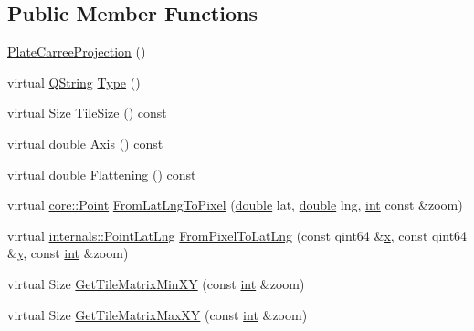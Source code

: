 \subsection*{Public Member Functions}
\begin{DoxyCompactItemize}
\item 
\hyperlink{group___o_p_map_widget_ga931c372d511eb5f902be68e721dea1a1}{Plate\-Carree\-Projection} ()
\item 
virtual \hyperlink{group___u_a_v_objects_plugin_gab9d252f49c333c94a72f97ce3105a32d}{Q\-String} \hyperlink{group___o_p_map_widget_ga71ab3c89676e92a088c8ac2ce4058142}{Type} ()
\item 
virtual Size \hyperlink{group___o_p_map_widget_gacf9afa88981c6504040c08c19731ea98}{Tile\-Size} () const 
\item 
virtual \hyperlink{_super_l_u_support_8h_a8956b2b9f49bf918deed98379d159ca7}{double} \hyperlink{group___o_p_map_widget_ga0917ee78fdc28e179792601c612072e9}{Axis} () const 
\item 
virtual \hyperlink{_super_l_u_support_8h_a8956b2b9f49bf918deed98379d159ca7}{double} \hyperlink{group___o_p_map_widget_ga9826466bb3f7ed3e3bd1f3a5b8a538d5}{Flattening} () const 
\item 
virtual \hyperlink{structcore_1_1_point}{core\-::\-Point} \hyperlink{group___o_p_map_widget_ga36e2342a818ea95326dc2100e9f39460}{From\-Lat\-Lng\-To\-Pixel} (\hyperlink{_super_l_u_support_8h_a8956b2b9f49bf918deed98379d159ca7}{double} lat, \hyperlink{_super_l_u_support_8h_a8956b2b9f49bf918deed98379d159ca7}{double} lng, \hyperlink{ioapi_8h_a787fa3cf048117ba7123753c1e74fcd6}{int} const \&zoom)
\item 
virtual \hyperlink{structinternals_1_1_point_lat_lng}{internals\-::\-Point\-Lat\-Lng} \hyperlink{group___o_p_map_widget_gadd2ce1ff11cbb8b8704013b12cf8865f}{From\-Pixel\-To\-Lat\-Lng} (const qint64 \&\hyperlink{glext_8h_a1db9d104e3c2128177f26aff7b46982f}{x}, const qint64 \&\hyperlink{glext_8h_a42315f3ed8fff752bb47fd782309fcfc}{y}, const \hyperlink{ioapi_8h_a787fa3cf048117ba7123753c1e74fcd6}{int} \&zoom)
\item 
virtual Size \hyperlink{group___o_p_map_widget_ga5e7a2f9214e18785a5c7c87321caea12}{Get\-Tile\-Matrix\-Min\-X\-Y} (const \hyperlink{ioapi_8h_a787fa3cf048117ba7123753c1e74fcd6}{int} \&zoom)
\item 
virtual Size \hyperlink{group___o_p_map_widget_ga8523592554481d4a42f407d160ade5cd}{Get\-Tile\-Matrix\-Max\-X\-Y} (const \hyperlink{ioapi_8h_a787fa3cf048117ba7123753c1e74fcd6}{int} \&zoom)
\end{DoxyCompactItemize}

